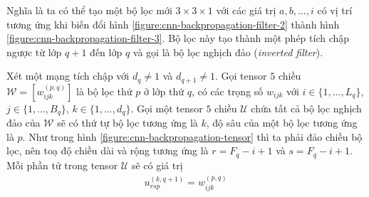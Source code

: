 Nghĩa là ta có thể tạo một bộ lọc mới $3\times 3\times 1$ với các giá trị $a,b,\dots,i$ có vị trí tương ứng khi biến đổi hình \ref{figure:cnn-backpropagation-filter-2} thành hình \ref{figure:cnn-backpropagation-filter-3}. Bộ lọc này tạo thành một phép tích chập ngược từ lớp $q+1$ đến lớp $q$ và gọi là bộ lọc nghịch đảo (\textit{inverted filter}).

Xét một mạng tích chập với $d_q\neq 1$ và $d_{q+1}\neq 1$. Gọi tensor $5$ chiều $\mathcal W=[w_{ijk}^{(p,q)}]$ là bộ lọc thứ $p$ ở lớp thứ $q$, có các trọng số $w_{ijk}$ với $i\in\{1,\dots,L_q\}$, $j\in\{1,\dots,B_q\}$, $k\in\{1,\dots,d_q\}$. Gọi một tensor $5$ chiều $\mathcal U$ chứa tất cả bộ lọc nghịch đảo của $\mathcal W$ sẽ có thứ tự bộ lọc tương ứng là $k$, độ sâu của một bộ lọc tương ứng là $p$. Như trong hình \ref{figure:cnn-backpropagation-tensor} thì ta phải đảo chiều bộ lọc, nên toạ độ chiều dài và rộng tương ứng là $r=F_q-i+1$ và $s=F_q-i+1$. Mỗi phần tử trong tensor $\mathcal U$ sẽ có giá trị \cite{Aggarwal2023-zk}
\begin{align}
    u_{rsp}^{(k,q+1)}=w_{ijk}^{(p,q)}
\end{align}
